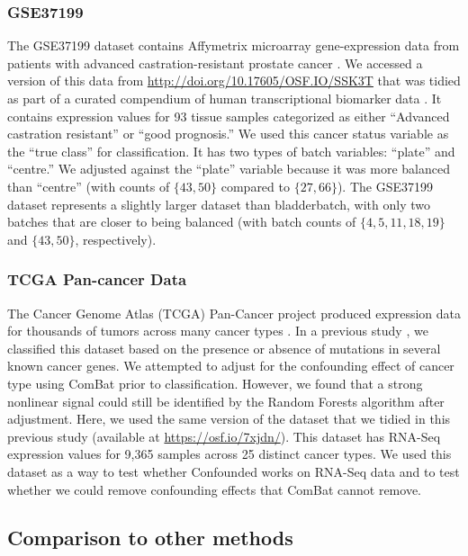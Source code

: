 \documentclass[notitlepage]{article}
\begin{document}
\subsubsection{GSE37199}

The GSE37199 dataset contains Affymetrix microarray gene-expression data from patients with advanced castration-resistant prostate cancer \cite{olmos_prognostic_2012}.
We accessed a version of this data from \url{http://doi.org/10.17605/OSF.IO/SSK3T} that was tidied as part of a curated compendium of human transcriptional biomarker data \cite{golightly_curated_2018}.
It contains expression values for 93 tissue samples categorized as either ``Advanced castration resistant'' or ``good prognosis.''
We used this cancer status variable as the ``true class'' for classification.
It has two types of batch variables: ``plate'' and ``centre.''
We adjusted against the ``plate'' variable because it was more balanced than ``centre'' (with counts of $\{43, 50\}$ compared to $\{27, 66\}$).
The GSE37199 dataset represents a slightly larger dataset than bladderbatch, with only two batches that are closer to being balanced (with batch counts of $\{4, 5, 11, 18, 19\}$ and $\{43, 50\}$, respectively).

\subsubsection{TCGA Pan-cancer Data}

The Cancer Genome Atlas (TCGA) Pan-Cancer project produced expression data for thousands of tumors across many cancer types \cite{the_cancer_genome_atlas_research_network_cancer_2013}.
In a previous study \cite{dayton_classifying_2017-1}, we classified this dataset based on the presence or absence of mutations in several known cancer genes.
We attempted to adjust for the confounding effect of cancer type using ComBat prior to classification.
However, we found that a strong nonlinear signal could still be identified by the Random Forests algorithm after adjustment.
Here, we used the same version of the dataset that we tidied in this previous study (available at \url{https://osf.io/7xjdn/}).
This dataset has RNA-Seq expression values for 9,365 samples across 25 distinct cancer types.
We used this dataset as a way to test whether Confounded works on RNA-Seq data and to test whether we could remove confounding effects that ComBat cannot remove.

\subsection{Comparison to other methods}
\end{document}
